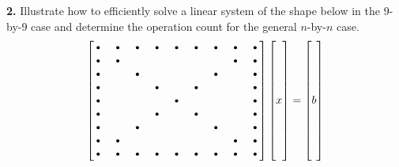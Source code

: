 \documentclass[12pt]{article}
\newcommand{\problem}[1]{\hspace{-4 ex} \large \textbf{#1}}
\begin{document}
\problem{2.} Illustrate how to efficiently solve a linear system of the shape below in the 9-by-9 case and determine the operation count for the general $n$-by-$n$ case.
	$$
	\begin{bmatrix}
		\text{\textbullet}&\text{\textbullet}&\text{\textbullet}&\text{\textbullet}&\text{\textbullet}&\text{\textbullet}&\text{\textbullet}&\text{\textbullet}&\text{\textbullet}\\
		\text{\textbullet}&\text{\textbullet}&&&&&&\text{\textbullet}&\text{\textbullet}\\
		\text{\textbullet}&&\text{\textbullet}&&&&\text{\textbullet}&&\text{\textbullet}\\
		\text{\textbullet}&&&\text{\textbullet}&&\text{\textbullet}&&&\text{\textbullet}\\
		\text{\textbullet}&&&&\text{\textbullet}&&&&\text{\textbullet}\\
		\text{\textbullet}&&&\text{\textbullet}&&\text{\textbullet}&&&\text{\textbullet}\\
		\text{\textbullet}&&\text{\textbullet}&&&&\text{\textbullet}&&\text{\textbullet}\\
		\text{\textbullet}&\text{\textbullet}&&&&&&\text{\textbullet}&\text{\textbullet}\\
		\text{\textbullet}&\text{\textbullet}&\text{\textbullet}&\text{\textbullet}&\text{\textbullet}&\text{\textbullet}&\text{\textbullet}&\text{\textbullet}&\text{\textbullet}\\
	\end{bmatrix}\begin{bmatrix}\\ \\ \\ \\ x \\ \\ \\ \\ \\\end{bmatrix}= \begin{bmatrix}\\ \\ \\ \\ b \\ \\ \\ \\ \\\end{bmatrix}
	$$
\end{document}
